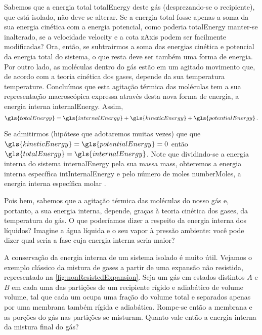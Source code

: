     Sabemos que a energia total \gls{totalEnergy} deste gás (desprezando-se o
    recipiente), que está isolado, não deve se alterar.  Se a energia total
    fosse apenas a soma da sua energia cinética com a energia potencial, como
    poderia \gls{totalEnergy} manter-se inalterado, se a velocidade
    \gls{velocity} e a cota \gls{zAxis} podem ser facilmente modificadas?  Ora,
    então, se subtrairmos a soma das energias cinética e potencial da energia
    total do sistema, o que resta deve ser também uma forma de energia.  Por
    outro lado, as moléculas dentro do gás estão em um agitado movimento que,
    de acordo com a teoria cinética dos gases, depende da sua temperatura
    \gls{temperature}. Concluímos que esta agitação térmica das moléculas tem a
    sua representação macroscópica expressa através desta nova forma de
    energia, a energia interna \gls{internalEnergy}. Assim,
    \begin{equation} \label{eq:2.7}
        \gls{totalEnergy}
        =
        \gls{internalEnergy}
        +
        \gls{kineticEnergy}
        +
        \gls{potentialEnergy}\,.
    \end{equation}

    Se admitirmos (hipótese que adotaremos muitas vezes) que que
    $\gls{kineticEnergy} = \gls{potentialEnergy} = 0$ então $\gls{totalEnergy}
    = \gls{internalEnergy}$. Note que dividindo-se a energia interna do sistema
    \gls{internalEnergy} pela sua massa \gls{mass}, obteremos a energia interna
    específica \gls{intInternalEnergy} e pelo número de moles
    \gls{numberMoles}, a energia interna específica molar
    .

    Pois bem, sabemos que a agitação térmica das moléculas do nosso gás e,
    portanto, a sua energia interna, depende, graças à teoria cinética dos
    gases, da temperatura do gás. O que poderíamos dizer a respeito da energia
    interna dos líquidos? Imagine a água líquida e o seu vapor à pressão
    ambiente: você pode dizer qual seria a fase cuja energia interna seria
    maior?

    A conservação da energia interna de um sistema isolado é muito útil.
    Vejamos o exemplo clássico da mistura de gases a partir de uma expansão não
    resistida, representado na \cref{fig:nonResistedExpansion}. Seja um gás em
    estados distintos $A$ e $B$ em cada uma das partições de um recipiente
    rígido e adiabático de volume \gls{volume}, tal que cada um ocupa uma
    fração do volume total e separados apenas por uma membrana também rígida e
    adiabática. Rompe-se então a membrana e as porções do gás nas partições se
    misturam. Quanto vale então a energia interna da mistura final do gás?

